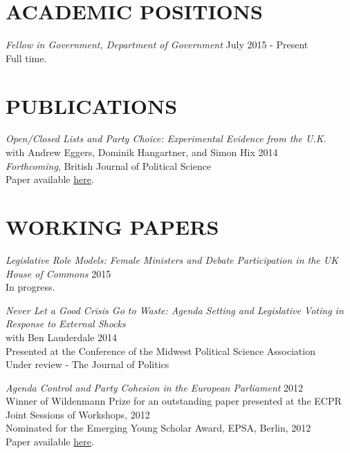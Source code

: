 \documentclass[line,margin]{res}
\begin{document}
\address{j.blumenau@lse.ac.uk, 0207 955 6984\\ \url{http://www.jackblumenau.com}}%
 
\begin{resume}

\section{ACADEMIC POSITIONS} 
{\sl Fellow in Government, Department of Government} \hfill July 2015 - Present\\
 Full time.
\section{PUBLICATIONS} 

{\sl Open/Closed Lists and Party Choice: Experimental Evidence from the U.K.}\\with Andrew Eggers, Dominik Hangartner, and Simon Hix \hfill 2014\\
\emph{Forthcoming}, British Journal of Political Science\\
Paper available \href{https://www.academia.edu/7934679/Open_Closed_List_and_Party_Choice_Experimental_Evidence_from_the_U.K} {here}.

\section{WORKING PAPERS} 
{\sl Legislative Role Models: Female Ministers and Debate Participation in the UK House of Commons} \hfill 2015\\
In progress.

{\sl Never Let a Good Crisis Go to Waste: Agenda Setting and Legislative Voting in Response to External Shocks} \\with Ben Lauderdale \hfill 2014\\
Presented at the Conference of the Midwest Political Science Association\\
Under review - The Journal of Politics

{\sl Agenda Control and Party Cohesion in the European Parliament}  \hfill 2012\\
Winner of Wildenmann Prize for an outstanding paper presented at the ECPR Joint Sessions of Workshops, 2012\\
Nominated for the Emerging Young Scholar Award, EPSA, Berlin, 2012\\
Paper available \href{http://www.academia.edu/2151951/Agenda_Control_and_Party_Cohesion_in_the_European_Parliament} {here}.


\end{resume}
\end{document}
